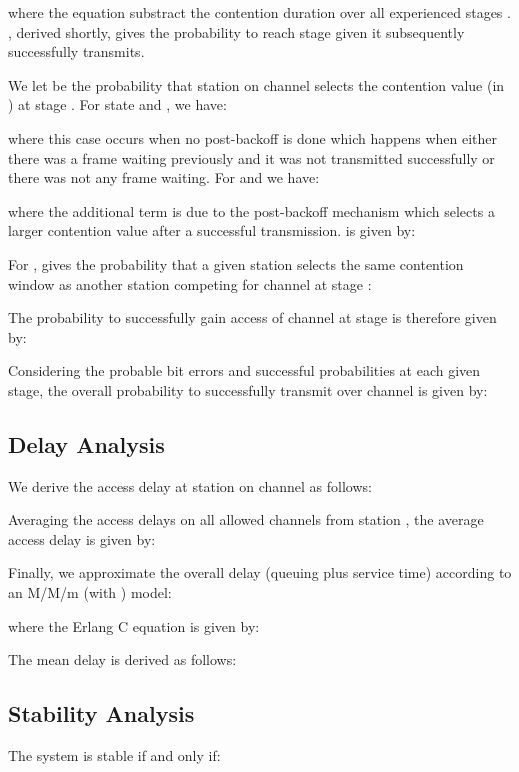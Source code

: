 \documentclass[journal,10pt,draftclsnofoot,onecolumn]{IEEEtran}
\begin{document}
  
where the equation substract the contention duration over all experienced stages . , derived shortly, gives the probability to reach stage  given it subsequently successfully transmits.

We let  be the probability that station  on channel  selects the contention value (in )  at stage . For state  and , we have:


where this case occurs when no post-backoff is done which happens when either there was a frame waiting previously and it was not transmitted successfully or there was not any frame waiting. For  and  we have:


where the additional term is due to the post-backoff mechanism which selects a larger contention value after a successful transmission.  is given by:


	For ,  gives the probability that a given station  selects the same contention window as another station competing for channel  at stage :


	The probability to successfully gain access of channel  at stage  is therefore given by:



Considering the probable bit errors and successful probabilities at each given stage, the overall probability to successfully transmit over channel  is given by:



\subsection{Delay Analysis}

	We derive the access delay at station  on channel  as follows:



	Averaging the access delays on all allowed channels from station , the average access delay is given by:



	Finally, we approximate the overall delay (queuing plus service time) according to an M/M/m (with ) model:


where the Erlang C equation  is given by:


	The mean delay is derived as follows:



\subsection{Stability Analysis}

The system is stable if and only if:
\end{document}
